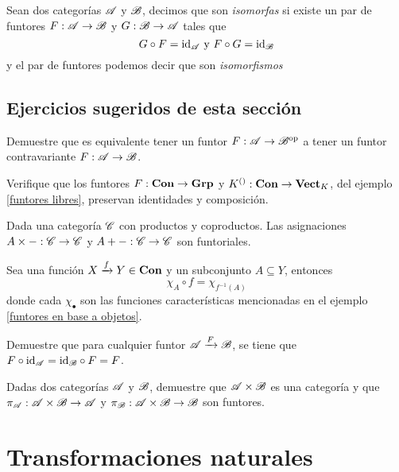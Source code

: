 \documentclass{comunicaciones}
\begin{document}
\begin{dfn}
    Sean dos categorías $\mathscr A$ y $\mathscr B$, decimos que son \emph{isomorfas} si existe un par de funtores $F:\mathscr A\to\mathscr B$ y $G:\mathscr B\to\mathscr A$ tales que
    \[G\circ F=\mathrm{id}_\mathscr A \text{  y  }F\circ G=\mathrm{id}_\mathscr B\]
    y el par de funtores podemos decir que son \emph{isomorfismos}
\end{dfn}

\subsection{Ejercicios sugeridos de esta sección}

\begin{ex}
    Demuestre que es equivalente tener un funtor $F:\mathscr A\to\mathscr B^{\mathrm{op}}$ a tener un funtor contravariante $F:\mathscr A\to\mathscr B$.
\end{ex}

\begin{ex}
    Verifique que los funtores $F:\mathbf{Con}\to\mathbf{Grp}$ y $K^{()}:\mathbf{Con}\to\mathbf{Vect}_K$, del ejemplo \ref{funtores libres}, preservan identidades y composición.
\end{ex}

\begin{ex}
    Dada una categoría $\mathscr C$ con productos y coproductos. Las asignaciones $A\times-:\mathscr C\to\mathscr C$ y $A+-:\mathscr C\to\mathscr C$ son funtoriales. 
\end{ex}

\begin{ex}
    Sea una función $X\xrightarrow{f}Y\in\mathbf{Con}$ y un subconjunto $A\subseteq Y$, entonces
    \[\chi_A\circ f=\chi_{f^{-1}(A)}\]
    donde cada $\chi_\bullet$ son las funciones características mencionadas en el ejemplo \ref{funtores en base a objetos}.
\end{ex}

\begin{ex}
    Demuestre que para cualquier funtor $\mathscr A\xrightarrow{F}\mathscr B$, se tiene que $F\circ\mathrm{id}_\mathscr A=\mathrm{id}_\mathscr B\circ F=F$.
\end{ex}

\begin{ex}
    Dadas dos categorías $\mathscr A$ y $\mathscr B$, demuestre que $\mathscr A\times\mathscr B$ es una categoría y que $\pi_\mathscr A:\mathscr A\times\mathscr B\to\mathscr A$ y $\pi_\mathscr B:\mathscr A\times\mathscr B\to\mathscr B$ son funtores.
\end{ex}

\section{Transformaciones naturales}
\end{document}

